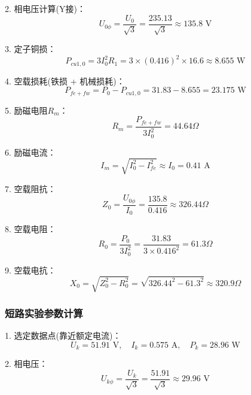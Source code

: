 \documentclass[12pt,a4paper]{article}
\begin{document}
2. 相电压计算(Y接)：
\begin{equation*}
U_{0\phi} = \frac{U_0}{\sqrt{3}} = \frac{235.13}{\sqrt{3}} \approx 135.8\text{ V}
\end{equation*}

3. 定子铜损：
\begin{equation*}
P_{cu1,0} = 3I_0^2 R_1 = 3 \times (0.416)^2 \times 16.6 \approx 8.655\text{ W}
\end{equation*}

4. 空载损耗(铁损 + 机械损耗)：
\begin{equation*}
P_{fe + fw} = P_0 - P_{cu1,0} = 31.83 - 8.655 = 23.175\text{ W}
\end{equation*}

5. 励磁电阻$R_m$：
\begin{equation*}
R_m = \frac{P_{fe + fw}}{3I_0^2} = 44.64\Omega
\end{equation*}

6. 励磁电流：
\begin{equation*}
I_m = \sqrt{I_0^2 - I_{fe}^2} \approx I_0 = 0.41\text{ A}
\end{equation*}

7. 空载阻抗：
\begin{equation*}
Z_0 = \frac{U_{0\phi}}{I_0} = \frac{135.8}{0.416} \approx 326.44\Omega
\end{equation*}

8. 空载电阻：
\begin{equation*}
R_0 = \frac{P_0}{3I_0^2} = \frac{31.83}{3 \times 0.416^2} = 61.3\Omega
\end{equation*}

9. 空载电抗：
\begin{equation*}
X_0 = \sqrt{Z_0^2 - R_0^2} = \sqrt{326.44^2 - 61.3^2} \approx 320.9\Omega
\end{equation*}

\subsubsection{短路实验参数计算}

1. 选定数据点(靠近额定电流)：
\begin{equation*}
U_k = 51.91\text{ V}, \quad I_k = 0.575\text{ A}, \quad P_k = 28.96\text{ W}
\end{equation*}

2. 相电压：
\begin{equation*}
U_{k\phi} = \frac{U_k}{\sqrt{3}} = \frac{51.91}{\sqrt{3}} \approx 29.96\text{ V}
\end{equation*}
\end{document}
